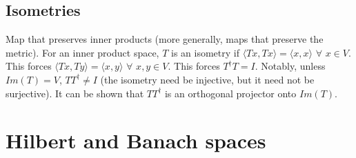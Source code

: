 \subsection{Isometries}
Map that preserves inner products (more generally, maps that preserve the metric). For an inner product space, $T$ is an isometry if $\langle Tx, Tx\rangle = \langle x, x\rangle$ $\forall$ $x\in V$. This forces $\langle Tx, Ty\rangle = \langle x, y\rangle$ $\forall$ $x,y\in V$. This forces $T^\dagger T=I$. Notably, unless $Im(T)=V$, $TT^\dagger\ne I$ (the isometry need be injective, but it need not be surjective). It can be shown that $TT^\dagger$ is an orthogonal projector onto $Im(T)$.

\section{Hilbert and Banach spaces}
